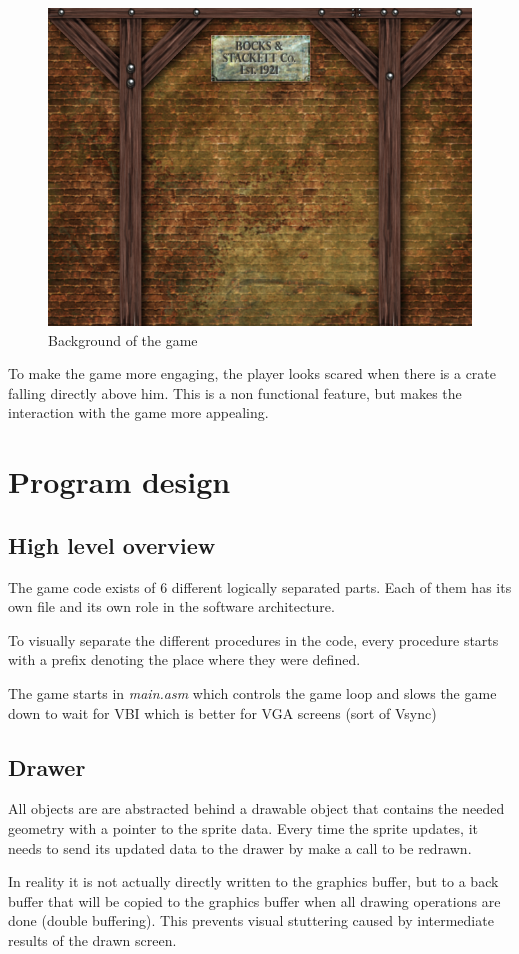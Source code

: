 \documentclass[]{article}
\begin{document}
\begin{figure}[htpb]
    \centering
    \includegraphics[width=0.4\linewidth]{../sprites/Background.png}
    \caption{Background of the game}%
\end{figure}

To make the game more engaging, the player looks scared when there is a crate
falling directly above him. This is a non functional feature, but makes the 
interaction with the game more appealing.

\section{Program design}

\subsection{High level overview}%
\label{sub:high_level_overview}

The game code exists of 6 different logically separated parts. Each of them
has its own file and its own role in the software architecture.

To visually separate the different procedures in the code, every procedure
starts with a prefix denoting the place where they were defined.

The game starts in \emph{main.asm} which controls the game loop and slows the
game down to wait for VBI which is better for VGA screens (sort of Vsync)

\subsection{Drawer}%
\label{sub:drawer}

All objects are are abstracted behind a drawable object that contains the
needed geometry with a pointer to the sprite data. Every time the sprite
updates, it needs to send its updated data to the drawer by make a call to be
redrawn.

In reality it is not actually directly written to the graphics buffer,
but to a back buffer that will be copied to the graphics buffer when all
drawing operations are done (double buffering). This prevents visual stuttering
caused by intermediate results of the drawn screen.
\end{document}
